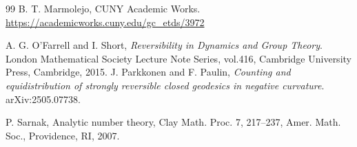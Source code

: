 \documentclass[11pt]{amsart}
\numberwithin{equation}{section}
\numberwithin{equation}{section}
\begin{document}
\begin{thebibliography}{99}
			 B. T. Marmolejo, 
			\newblock CUNY Academic Works.
			\newblock \url{https://academicworks.cuny.edu/gc_etds/3972}
			
			
			
			 A.  G. O’Farrell and I.  Short, {\it Reversibility in Dynamics and Group Theory}. London Mathematical Society Lecture Note Series, vol.416, Cambridge University Press, Cambridge, 2015.
			 J. Parkkonen and F. Paulin, {\em Counting and equidistribution of strongly reversible closed geodesics in negative curvature}. arXiv:2505.07738. 
			
	
			 P. Sarnak, 
			\newblock Analytic number theory,  
			Clay Math. Proc. 7,  217–237, Amer. Math. Soc., Providence, RI, 2007.

		\end{thebibliography}
	
\end{document}
